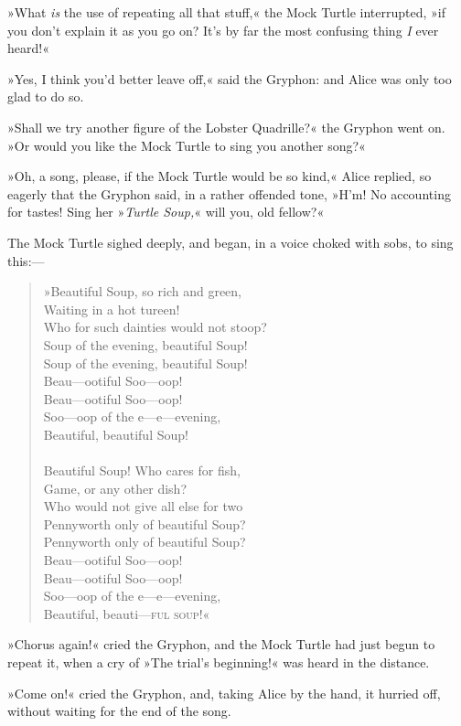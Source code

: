 »What \textit{is} the use of repeating all that stuff,« the Mock Turtle interrupted, »if you don't explain it as you go on? It's by far the most confusing thing \textit{I} ever heard!«

»Yes, I think you'd better leave off,« said the Gryphon: and Alice was only too glad to do so.

»Shall we try another figure of the Lobster Quadrille?« the Gryphon went on. »Or would you like the Mock Turtle to sing you another song?«

»Oh, a song, please, if the Mock Turtle would be so kind,« Alice replied, so eagerly that the Gryphon said, in a rather offended tone, »H'm! No accounting for tastes! Sing her »\textit{Turtle Soup,}« will you, old fellow?«

The Mock Turtle sighed deeply, and began, in a voice choked with sobs, to sing this:—

\begin{verse}
»Beautiful Soup, so rich and green,\\
Waiting in a hot tureen!\\
Who for such dainties would not stoop?\\
Soup of the evening, beautiful Soup!\\
Soup of the evening, beautiful Soup!\\
Beau—ootiful Soo—oop!\\
Beau—ootiful Soo—oop!\\
Soo—oop of the e—e—evening,\\
Beautiful, beautiful Soup!\\
~\\
Beautiful Soup! Who cares for fish,\\
Game, or any other dish?\\
Who would not give all else for two\\
Pennyworth only of beautiful Soup?\\
Pennyworth only of beautiful Soup?\\
Beau—ootiful Soo—oop!\\
Beau—ootiful Soo—oop!\\
Soo—oop of the e—e—evening,\\
Beautiful, beauti—\textsc{ful soup}\@!«
\end{verse}


»Chorus again!« cried the Gryphon, and the Mock Turtle had just begun to repeat it, when a cry of »The trial's beginning!« was heard in the distance.

»Come on!« cried the Gryphon, and, taking Alice by the hand, it hurried off, without waiting for the end of the song.

